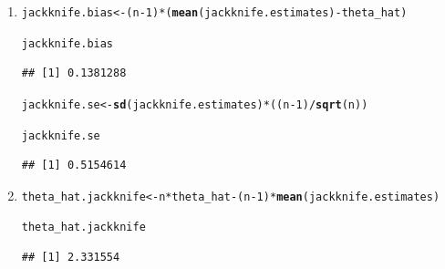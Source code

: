 \documentclass[11pt, a4paper]{article}\usepackage[]{graphicx}\usepackage[]{xcolor}
\makeatletter
\newcommand{\hlnum}[1]{\textcolor[rgb]{0.686,0.059,0.569}{#1}}%
\newcommand{\hlopt}[1]{\textcolor[rgb]{0,0,0}{#1}}%
\newcommand{\hldef}[1]{\textcolor[rgb]{0.345,0.345,0.345}{#1}}%
\newcommand{\hlkwb}[1]{\textcolor[rgb]{0.69,0.353,0.396}{#1}}%
\newcommand{\hlkwd}[1]{\textcolor[rgb]{0.737,0.353,0.396}{\textbf{#1}}}%
\newenvironment{kframe}{%
 \def\at@end@of@kframe{}%
 \ifinner\ifhmode%
  \def\at@end@of@kframe{\end{minipage}}%
  \begin{minipage}{\columnwidth}%
 \fi\fi%
 \def\FrameCommand##1{\hskip\@totalleftmargin \hskip-\fboxsep
 \colorbox{shadecolor}{##1}\hskip-\fboxsep
     \hskip-\linewidth \hskip-\@totalleftmargin \hskip\columnwidth}%
 \MakeFramed {\advance\hsize-\width
   \@totalleftmargin\z@ \linewidth\hsize
   \@setminipage}}%
 {\par\unskip\endMakeFramed%
 \at@end@of@kframe}
\newenvironment{knitrout}{}{} %
\makeatother
\begin{document}
\begin{enumerate}
\item[\scalebox{2.0}{\twemoji{keycap: 2}}]

\begin{knitrout}
\color{fgcolor}\begin{kframe}
\begin{alltt}
\hldef{jackknife.bias} \hlkwb{<-} \hldef{(n} \hlopt{-} \hlnum{1}\hldef{)} \hlopt{*} \hldef{(}\hlkwd{mean}\hldef{(jackknife.estimates)} \hlopt{-} \hldef{theta_hat)}

\hldef{jackknife.bias}
\end{alltt}
\begin{verbatim}
## [1] 0.1381288
\end{verbatim}
\end{kframe}
\end{knitrout}

\begin{knitrout}
\color{fgcolor}\begin{kframe}
\begin{alltt}
\hldef{jackknife.se} \hlkwb{<-} \hlkwd{sd}\hldef{(jackknife.estimates)} \hlopt{*} \hldef{( (n} \hlopt{-} \hlnum{1}\hldef{)} \hlopt{/} \hlkwd{sqrt}\hldef{(n) )}

\hldef{jackknife.se}
\end{alltt}
\begin{verbatim}
## [1] 0.5154614
\end{verbatim}
\end{kframe}
\end{knitrout}

\item[\scalebox{2.0}{\twemoji{keycap: 3}}]

\begin{knitrout}
\color{fgcolor}\begin{kframe}
\begin{alltt}
\hldef{theta_hat.jackknife} \hlkwb{<-} \hldef{n} \hlopt{*} \hldef{theta_hat} \hlopt{-} \hldef{(n} \hlopt{-} \hlnum{1}\hldef{)} \hlopt{*} \hlkwd{mean}\hldef{(jackknife.estimates)}

\hldef{theta_hat.jackknife}
\end{alltt}
\begin{verbatim}
## [1] 2.331554
\end{verbatim}
\end{kframe}
\end{knitrout}


\end{enumerate}
\end{document}
